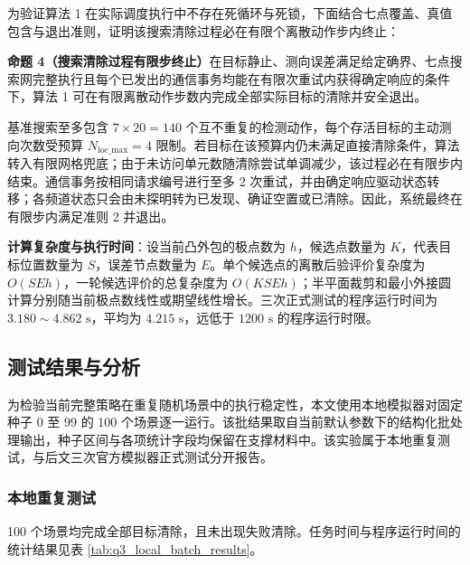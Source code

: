 \documentclass[zihao=-4,a4paper,UTF8]{ctexart}
\begin{document}
为验证算法 1 在实际调度执行中不存在死循环与死锁，下面结合七点覆盖、真值包含与退出准则，证明该搜索清除过程必在有限个离散动作步内终止：

\noindent\textbf{命题 4（搜索清除过程有限步终止）}\quad 在目标静止、测向误差满足给定确界、七点搜索网完整执行且每个已发出的通信事务均能在有限次重试内获得确定响应的条件下，算法 1 可在有限离散动作步数内完成全部实际目标的清除并安全退出。

\begin{cumcmproof}
基准搜索至多包含 $7\times20=140$ 个互不重复的检测动作，每个存活目标的主动测向次数受预算 $N_{\mathrm{loc\_max}}=4$ 限制。若目标在该预算内仍未满足直接清除条件，算法转入有限网格兜底；由于未访问单元数随清除尝试单调减少，该过程必在有限步内结束。通信事务按相同请求编号进行至多 2 次重试，并由确定响应驱动状态转移；各频道状态只会由未探明转为已发现、确证空置或已清除。因此，系统最终在有限步内满足准则 2 并退出。
\end{cumcmproof}

\noindent\textbf{计算复杂度与执行时间}：设当前凸外包的极点数为 $h$，候选点数量为 $K$，代表目标位置数量为 $S$，误差节点数量为 $E$。单个候选点的离散后验评价复杂度为 $O(SEh)$，一轮候选评价的总复杂度为 $O(KSEh)$；半平面裁剪和最小外接圆计算分别随当前极点数线性或期望线性增长。三次正式测试的程序运行时间为 $3.180\sim4.862\text{ s}$，平均为 $4.215\text{ s}$，远低于 $1200\text{ s}$ 的程序运行时限。

\subsection{测试结果与分析}

为检验当前完整策略在重复随机场景中的执行稳定性，本文使用本地模拟器对固定种子 0 至 99 的 100 个场景逐一运行。该批结果取自当前默认参数下的结构化批处理输出，种子区间与各项统计字段均保留在支撑材料中。该实验属于本地重复测试，与后文三次官方模拟器正式测试分开报告。

\subsubsection{本地重复测试}

100 个场景均完成全部目标清除，且未出现失败清除。任务时间与程序运行时间的统计结果见表 \ref{tab:q3_local_batch_results}。
\end{document}
